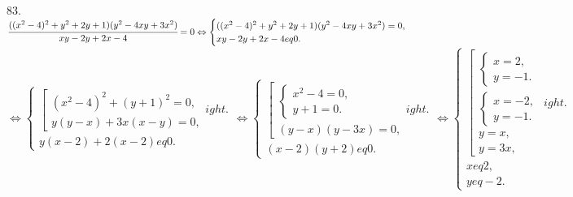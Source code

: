 83. $\cfrac{((x^2-4)^2+y^2+2y+1)(y^2-4xy+3x^2)}{xy-2y+2x-4}=0\Leftrightarrow
\begin{cases}
((x^2-4)^2+y^2+2y+1)(y^2-4xy+3x^2)=0,\\
xy-2y+2x-4
eq0.
\end{cases}$\\$\Leftrightarrow
\begin{cases}
\left[\begin{array}{l}
(x^2-4)^2+(y+1)^2=0,\\
y(y-x)+3x(x-y)=0,
\end{array}
ight.\\
y(x-2)+2(x-2)
eq0.
\end{cases}\Leftrightarrow
\begin{cases}
\left[\begin{array}{l}
\begin{cases}
x^2-4=0,\\
y+1=0.
\end{cases}\\
(y-x)(y-3x)=0,
\end{array}
ight.\\
(x-2)(y+2)
eq0.
\end{cases}\Leftrightarrow
\begin{cases}
\left[\begin{array}{l}
\begin{cases}
x=2,\\
y=-1.
\end{cases}\\
\begin{cases}
x=-2,\\
y=-1.
\end{cases}\\
y=x,\\
y=3x,
\end{array}
ight.\\
x
eq2,\\
y
eq-2.
\end{cases}$
\begin{figure}[ht!]
\end{figure}\\
